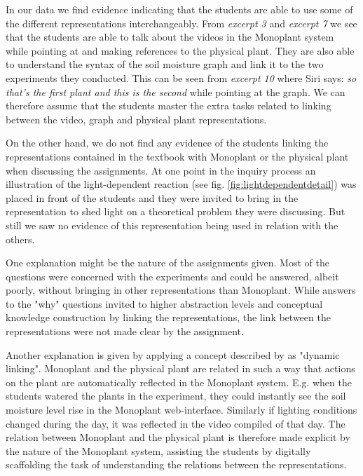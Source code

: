 In our data we find evidence indicating that the students are able to use some of the different representations interchangeably. From \emph{excerpt 3} and \emph{excerpt 7} we see that the students are able to talk about the videos in the Monoplant system while pointing at and making references to the physical plant. They are also able to understand the syntax of the soil moisture graph and link it to the two experiments they conducted. This can be seen from \emph{excerpt 10} where Siri says: \emph{so that's the first plant and this is the second} while pointing at the graph. We can therefore assume that the students master the extra tasks related to linking between the video, graph and physical plant representations. 

On the other hand, we do not find any evidence of the students linking the representations contained in the textbook with Monoplant or the physical plant when discussing the assignments. At one point in the inquiry process an illustration of the light-dependent reaction (see fig. \ref{fig:lightdependentdetail}) was placed in front of the students and they were invited to bring in the representation to shed light on a theoretical problem they were discussing. But still we saw no evidence of this representation being used in relation with the others. 

One explanation might be the nature of the assignments given. Most of the questions were concerned with the experiments and could be answered, albeit poorly, without bringing in other representations than Monoplant. While answers to the "why" questions invited to higher abstraction levels and conceptual knowledge construction by linking the representations, the link between the representations were not made clear by the assignment. 

Another explanation is given by applying a concept described by \citet{van2006supporting} as "dynamic linking". Monoplant and the physical plant are related in such a way that actions on the plant are automatically reflected in the Monoplant system. E.g. when the students watered the plants in the experiment, they could instantly see the soil moisture level rise in the Monoplant web-interface. Similarly if lighting conditions changed during the day, it was reflected in the video compiled of that day. The relation between Monoplant and the physical plant is therefore made explicit by the nature of the Monoplant system, assisting the students by digitally scaffolding the task of understanding the relations between the representations. 

